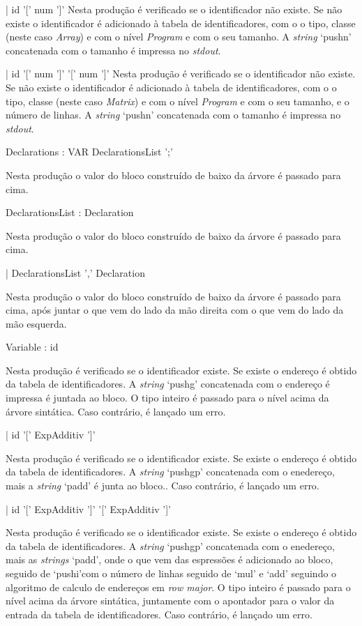 | id '[' num ']'              
Nesta produção é verificado se o identificador não existe. Se não existe
o identificador é adicionado à tabela de identificadores, com o o tipo, classe
(neste caso \emph{Array}) e com o nível \emph{Program} e com o seu tamanho. A \emph{string}
`pushn' concatenada com o tamanho é impressa no \emph{stdout}.   

   
| id '[' num ']' '[' num ']'  
Nesta produção é verificado se o identificador não existe. Se não existe
o identificador é adicionado à tabela de identificadores, com o o tipo, classe
(neste caso \emph{Matrix}) e com o nível \emph{Program} e com o seu tamanho,
e o número de linhas. A \emph{string}
`pushn' concatenada com o tamanho é impressa no \emph{stdout}.   

  

Declarations : VAR DeclarationsList ';'  

Nesta produção o valor do bloco construído de baixo da árvore é passado para
cima.


  

DeclarationsList : Declaration             

Nesta produção o valor do bloco construído de baixo da árvore é passado para
cima.



| DeclarationsList ',' Declaration         

Nesta produção o valor do bloco construído de baixo da árvore é passado para
cima, após juntar o que vem do lado da mão direita com o que vem do lado da mão
esquerda.


Variable : id                 

Nesta produção é verificado se o identificador existe. Se existe
o endereço é obtido da tabela de identificadores. A \emph{string}
`pushg' concatenada com o endereço é impressa é juntada ao bloco.
O tipo inteiro é passado para o nível acima da árvore sintática.
Caso contrário, é lançado um erro.


| id '[' ExpAdditiv ']'       

Nesta produção é verificado se o identificador existe. Se existe
o endereço é obtido da tabela de identificadores. A \emph{string}
`pushgp' concatenada com o enedereço, mais a \emph{string} `padd' é junta ao
bloco..
Caso contrário, é lançado um erro.


| id '[' ExpAdditiv ']' '[' ExpAdditiv ']' 

Nesta produção é verificado se o identificador existe. Se existe
o endereço é obtido da tabela de identificadores. A \emph{string}
`pushgp' concatenada com o enedereço, mais as \emph{strings} `padd', onde o que
vem das espressões é adicionado ao bloco, seguido de `pushi'com o número de
linhas seguido de `mul' e `add' seguindo o algoritmo de calculo de endereços em
\emph{row major}. 
O tipo inteiro é passado para o nível acima da árvore sintática, juntamente com
 o apontador para o valor da entrada da tabela de identificadores. 
Caso contrário, é lançado um erro.




